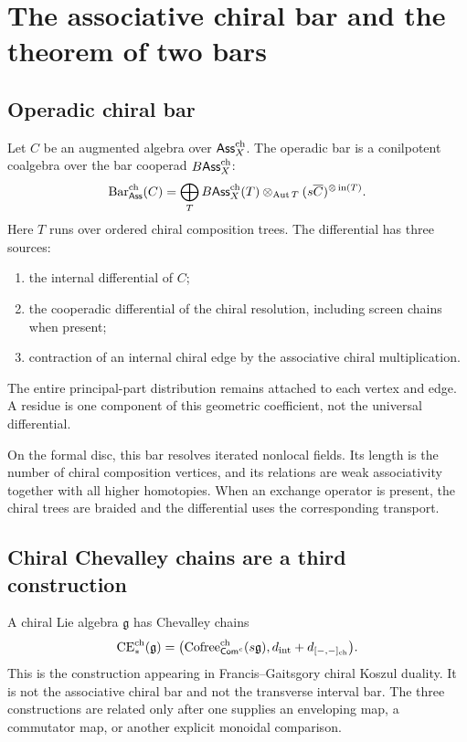 \chapter{The associative chiral bar and the theorem of two bars}\label{chap:two-bars}

\section{Operadic chiral bar}
Let \(C\) be an augmented algebra over \(\mathsf{Ass}^{\mathrm{ch}}_X\).  The operadic bar is a conilpotent coalgebra over the bar cooperad \(B\mathsf{Ass}^{\mathrm{ch}}_X\):
\[
 \operatorname{Bar}^{\mathrm{ch}}_{\mathsf{Ass}}(C)
 =\bigoplus_T
 B\mathsf{Ass}^{\mathrm{ch}}_X(T)\otimes_{\operatorname{Aut}T}
 (s\overline{C})^{\otimes\operatorname{in}(T)}.
\]
Here \(T\) runs over ordered chiral composition trees.  The differential has three sources:
\begin{enumerate}
\item the internal differential of \(C\);
\item the cooperadic differential of the chiral resolution, including screen chains when present;
\item contraction of an internal chiral edge by the associative chiral multiplication.
\end{enumerate}
The entire principal-part distribution remains attached to each vertex and edge.  A residue is one component of this geometric coefficient, not the universal differential.

On the formal disc, this bar resolves iterated nonlocal fields.  Its length is the number of chiral composition vertices, and its relations are weak associativity together with all higher homotopies.  When an exchange operator is present, the chiral trees are braided and the differential uses the corresponding transport.

\section{Chiral Chevalley chains are a third construction}
A chiral Lie algebra \(\mathfrak g\) has Chevalley chains
\[
 \operatorname{CE}_*^{\mathrm{ch}}(\mathfrak g)
 =\bigl(\operatorname{Cofree}_{\mathsf{Com}^c}^{\mathrm{ch}}(s\mathfrak g),d_{\mathrm{int}}+d_{[-,-]_{\mathrm{ch}}}\bigr).
\]
This is the construction appearing in Francis--Gaitsgory chiral Koszul duality.  It is not the associative chiral bar and not the transverse interval bar.  The three constructions are related only after one supplies an enveloping map, a commutator map, or another explicit monoidal comparison.

